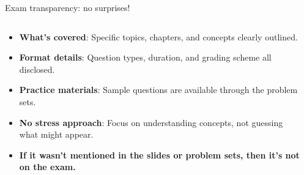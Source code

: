 \documentclass[aspectratio=169, lualatex, handout]{beamer}
\begin{document}
\begin{frame}{Exam transparency: no surprises!}
	\begin{columns}[c]
		\begin{column}{0.65\textwidth}
			\begin{itemize}[<+->]
				\item \textbf{What's covered}: Specific topics, chapters, and concepts clearly outlined.
				\item \textbf{Format details}: Question types, duration, and grading scheme all disclosed.
				\item \textbf{Practice materials}: Sample questions are available through the problem sets.
				\item \textbf{No stress approach}: Focus on understanding concepts, not guessing what might appear.
				\item \textbf{If it wasn't mentioned in the slides or problem sets, then it's not on the exam.}
			\end{itemize}
		\end{column}
		\begin{column}{0.35\textwidth}
		\end{column}
	\end{columns}
\end{frame}
\end{document}
